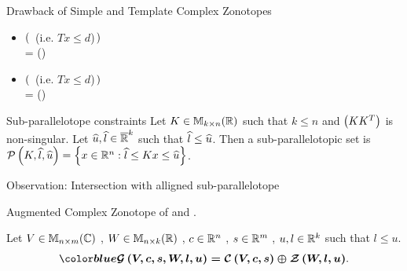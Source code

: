 \begin{frame}{Drawback of Simple and Template Complex Zonotopes}
\begin{itemize}
\item $\left(\right.$ \eqncol{$\bigcap$}  (i.e. {\color{teal}$Tx\leq d$})$\left.\right)$\\ = ()
\item $\left(\right.$ \eqncol{$\bigcap$}  (i.e. {\color{teal}$Tx\leq d$})$\left.\right)$\\= ()
\end{itemize}
{\color{violet}{\bf However!}}
\begin{exampleblock}{Sub-parallelotope constraints}
Let $K\in\mathbb{M}_{k\times n}(\mathbb{R})$ such that $k\leq n$ and $\left(KK^T\right)$ is
non-singular.  Let
  $\widehat{u},\widehat{l}\in\mathbb{\overline{R}}^k$ such that $\widehat{l}\leq\widehat{u}$.  Then
  a sub-parallelotopic set is $\mathcal{P}\left(K,\widehat{l},\widehat{u}\right) = \left\{x\in\mathbb{R}^n: \widehat{l}\leq Kx \leq \widehat{u}\right\}$.
\end{exampleblock}
\begin{block}{Observation: Intersection with alligned sub-parallelotope}
\textcol{\[\bm{
\zon{\pinv{K}}{l}{u} \bigcap \sptope{K}{\wh{l}}{\wh{u}}
= \zon{\pinv{K}}{l\bigvee \wh{l}}{u\bigwedge \wh{u}}}
\]}
\end{block}
\end{frame}

\begin{frame}{Augmented Complex Zonotope}
 of  and .
\begin{definition}
Let $V\in\mathbb{M}_{n\times m}(\mathbb{C})$ , $W\in\mathbb{M}_{n\times k}(\mathbb{R})$
, $c\in\mathbb{R}^n$ ,
$s\in\mathbb{R}^m$ , $u,l\in\mathbb{R}^k$  such that $l\leq u$.  
\begin{equation*}
\bm{\textcol{\gcz{V}{c}{s}{W}{l}{u} = \cz{V}{c}{s}\oplus\zon{W}{l}{u}}}.
\end{equation*}
\end{definition}
\end{frame}

